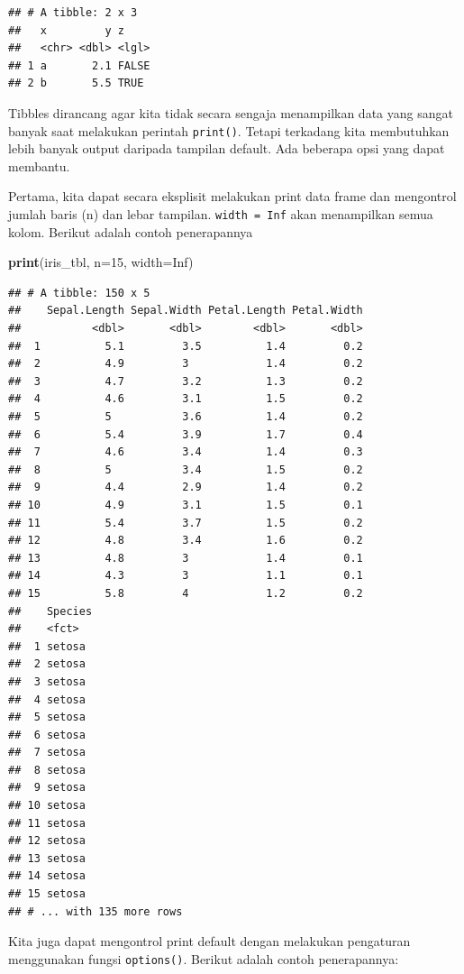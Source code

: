 \documentclass[]{book}
\newenvironment{Shaded}{\begin{snugshade}}{\end{snugshade}}
\newcommand{\KeywordTok}[1]{\textcolor[rgb]{0.13,0.29,0.53}{\textbf{#1}}}
\newcommand{\DataTypeTok}[1]{\textcolor[rgb]{0.13,0.29,0.53}{#1}}
\newcommand{\DecValTok}[1]{\textcolor[rgb]{0.00,0.00,0.81}{#1}}
\newcommand{\OtherTok}[1]{\textcolor[rgb]{0.56,0.35,0.01}{#1}}
\newcommand{\NormalTok}[1]{#1}
\begin{document}
\begin{verbatim}
## # A tibble: 2 x 3
##   x         y z    
##   <chr> <dbl> <lgl>
## 1 a       2.1 FALSE
## 2 b       5.5 TRUE
\end{verbatim}

Tibbles dirancang agar kita tidak secara sengaja menampilkan data yang
sangat banyak saat melakukan perintah \texttt{print()}. Tetapi terkadang
kita membutuhkan lebih banyak output daripada tampilan default. Ada
beberapa opsi yang dapat membantu.

Pertama, kita dapat secara eksplisit melakukan print data frame dan
mengontrol jumlah baris (n) dan lebar tampilan. \texttt{width\ =\ Inf}
akan menampilkan semua kolom. Berikut adalah contoh penerapannya

\begin{Shaded}
\begin{Highlighting}[]
\KeywordTok{print}\NormalTok{(iris_tbl, }\DataTypeTok{n=}\DecValTok{15}\NormalTok{, }\DataTypeTok{width=}\OtherTok{Inf}\NormalTok{)}
\end{Highlighting}
\end{Shaded}

\begin{verbatim}
## # A tibble: 150 x 5
##    Sepal.Length Sepal.Width Petal.Length Petal.Width
##           <dbl>       <dbl>        <dbl>       <dbl>
##  1          5.1         3.5          1.4         0.2
##  2          4.9         3            1.4         0.2
##  3          4.7         3.2          1.3         0.2
##  4          4.6         3.1          1.5         0.2
##  5          5           3.6          1.4         0.2
##  6          5.4         3.9          1.7         0.4
##  7          4.6         3.4          1.4         0.3
##  8          5           3.4          1.5         0.2
##  9          4.4         2.9          1.4         0.2
## 10          4.9         3.1          1.5         0.1
## 11          5.4         3.7          1.5         0.2
## 12          4.8         3.4          1.6         0.2
## 13          4.8         3            1.4         0.1
## 14          4.3         3            1.1         0.1
## 15          5.8         4            1.2         0.2
##    Species
##    <fct>  
##  1 setosa 
##  2 setosa 
##  3 setosa 
##  4 setosa 
##  5 setosa 
##  6 setosa 
##  7 setosa 
##  8 setosa 
##  9 setosa 
## 10 setosa 
## 11 setosa 
## 12 setosa 
## 13 setosa 
## 14 setosa 
## 15 setosa 
## # ... with 135 more rows
\end{verbatim}

Kita juga dapat mengontrol print default dengan melakukan pengaturan
menggunakan fungsi \texttt{options()}. Berikut adalah contoh
penerapannya:
\end{document}
